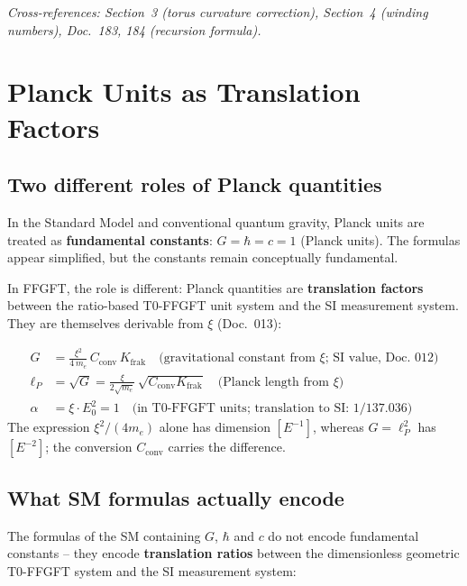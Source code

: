 \noindent\textit{Cross-references: Section~3 (torus curvature correction),
Section~4 (winding numbers), Doc.~183, 184 (recursion formula).}

\section{Planck Units as Translation Factors}

\subsection{Two different roles of Planck quantities}

In the Standard Model and conventional quantum gravity, Planck units
are treated as \textbf{fundamental constants}: $G = \hbar = c = 1$
(Planck units). The formulas appear simplified, but the constants
remain conceptually fundamental.

In FFGFT, the role is different: Planck quantities are
\textbf{translation factors} between the ratio-based T0-FFGFT unit system
and the SI measurement system. They are themselves derivable from
$\xi$ (Doc.~013):

\begin{align}
    G &= \frac{\xi^2}{4\,m_e}\,C_{\text{conv}}\,K_{\text{frak}}
    \quad \text{(gravitational constant from } \xi\text{; SI value, Doc.~012)} \\[4pt]
    \ell_P &= \sqrt{G} = \frac{\xi}{2\sqrt{m_e}}\,\sqrt{C_{\text{conv}}K_{\text{frak}}}
    \quad \text{(Planck length from } \xi\text{)} \\[4pt]
    \alpha &= \xi \cdot E_0^2 = 1
    \quad \text{(in T0-FFGFT units; translation to SI: } 1/137.036\text{)}
\end{align}
The expression $\xi^2/(4m_e)$ alone has dimension $[E^{-1}]$, whereas
$G = \ell_P^2$ has $[E^{-2}]$; the conversion $C_{\text{conv}}$ carries the
difference.

\subsection{What SM formulas actually encode}

The formulas of the SM containing $G$, $\hbar$ and $c$ do not encode
fundamental constants -- they encode \textbf{translation ratios}
between the dimensionless geometric T0-FFGFT system and the SI measurement
system:

